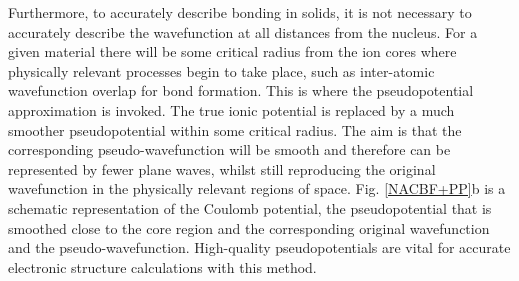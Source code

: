 \documentclass[11pt, twoside]{report}
\begin{document}

Furthermore, to accurately describe bonding in solids, it is not necessary to accurately describe the wavefunction at all distances from the nucleus. For a given material there will be some critical radius from the ion cores where physically relevant processes begin to take place, such as inter-atomic wavefunction overlap for bond formation. This is where the pseudopotential approximation is invoked. The true ionic potential is replaced by a much smoother pseudopotential within some critical radius. The aim is that the corresponding pseudo-wavefunction will be smooth and therefore can be represented by fewer plane waves, whilst still reproducing the original wavefunction in the physically relevant regions of space. Fig. \ref{NACBF+PP}b is a schematic representation of the Coulomb potential, the pseudopotential that is smoothed close to the core region and the corresponding original wavefunction and the pseudo-wavefunction. High-quality pseudopotentials are vital for accurate electronic structure calculations with this method. 
\end{document}

